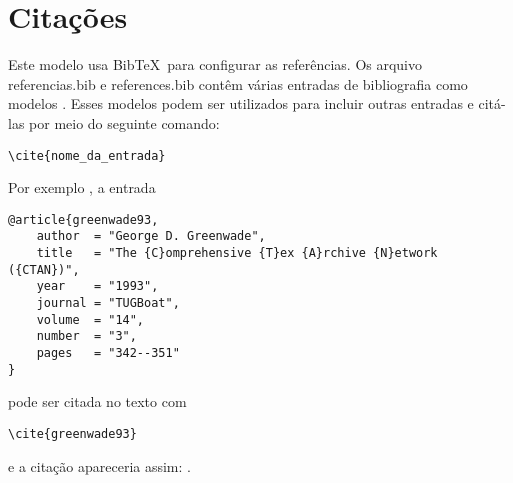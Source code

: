 \chapter{Citações}

Este modelo usa Bib\TeX\ para configurar as referências. Os arquivo referencias.bib e references.bib contêm várias entradas de bibliografia como modelos \cite{article,book,booklet,inbook}. Esses modelos podem ser utilizados para incluir outras entradas e citá-las por meio do seguinte comando:
\begin{verbatim}
\cite{nome_da_entrada}
\end{verbatim}

Por exemplo , a entrada
\begin{verbatim}
@article{greenwade93,
    author  = "George D. Greenwade",
    title   = "The {C}omprehensive {T}ex {A}rchive {N}etwork ({CTAN})",
    year    = "1993",
    journal = "TUGBoat",
    volume  = "14",
    number  = "3",
    pages   = "342--351"
}
\end{verbatim}
pode ser citada no texto com
\begin{verbatim}
\cite{greenwade93}
\end{verbatim}
e a citação apareceria assim: \cite{greenwade93}.

